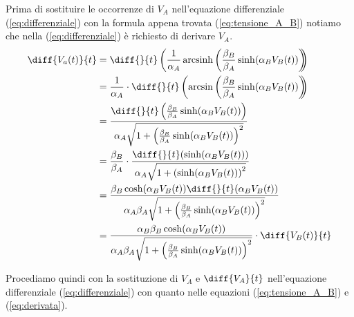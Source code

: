 	Prima di sostituire le occorrenze di $V_{A}$ nell'equazione differenziale (\ref{eq:differenziale}) con la formula appena trovata (\ref{eq:tensione_A_B}) notiamo che nella (\ref{eq:differenziale}) è richiesto di derivare $V_{A}$.
	\begin{equation}
		\label{eq:derivata}
		\begin{split}
			\diff{V_{a}(t)}{t} &= \diff{}{t}\left(\frac{1}{\alpha_{A}} \arcsinh \left(\frac{\beta_{B}}{\beta_{A}} \sinh(\alpha_{B}V_{B}(t))\right)\hspace{-5px}\right)\\
			&= \frac{1}{\alpha_{A}}\cdot\diff{}{t}\left(\arcsin\left(\frac{\beta_{B}}{\beta_{A}}\sinh(\alpha_{B}V_{B}(t))\right)\hspace{-5px}\right)\\
			&= \frac{\diff{}{t}\left(\frac{\beta_{B}}{\beta_{A}}\sinh(\alpha_{B}V_{B}(t))\right)}{\alpha_{A}\sqrt{1+\left(\frac{\beta_{B}}{\beta_{A}}\sinh(\alpha_{B}V_{B}(t))\right)^{2}}}\\
			&= \frac{\beta_{B}}{\beta_{A}}\cdot\frac{\diff{}{t}(\sinh(\alpha_{B}V_{B}(t)))}{\alpha_{A}\sqrt{1+\left(\sinh(\alpha_{B}V_{B}(t))\right)^{2}}}\\
			&= \frac{\beta_{B}\cosh(\alpha_{B}V_{B}(t))\diff{}{t}(\alpha_{B}V_{B}(t))}{\alpha_{A}\beta_{A}\sqrt{1+\left(\frac{\beta_{B}}{\beta_{A}}\sinh(\alpha_{B}V_{B}(t))\right)^{2}}}\\
			&= \frac{\alpha_{B}\beta_{B}\cosh(\alpha_{B}V_{B}(t))}{\alpha_{A}\beta_{A}\sqrt{1+\left(\frac{\beta_{B}}{\beta_{A}}\sinh(\alpha_{B}V_{B}(t))\right)^{2}}}\cdot\diff{V_{B}(t)}{t}
		\end{split}
	\end{equation}
	
	Procediamo quindi con la sostituzione di $V_{A}$ e $\diff{V_{A}}{t}$ nell'equazione differenziale (\ref{eq:differenziale}) con quanto nelle equazioni (\ref{eq:tensione_A_B}) e (\ref{eq:derivata}).
	\pagebreak
	
